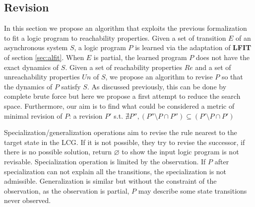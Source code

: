 \subsection{Revision}
\label{sec:algorithm}

    In this section we propose an algorithm that exploits the previous formalization to fit a logic program to reachability properties.
    Given a set of transition $E$ of an asynchronous system $S$, a logic program $P$ is learned via the adaptation of \textbf{LFIT} of section \ref{sec:alfit}.
    When $E$ is partial, the learned program $P$ does not have the exact dynamics of $S$.
    Given a set of reachability properties $Re$ and a set of unreachability properties $Un$ of $S$, we propose an algorithm to revise $P$ so that the dynamics of $P$ satisfy $S$.
    As discussed previously, this can be done by complete brute force but here we propose a first attempt to reduce the search space.
    Furthermore, our aim is to find what could be considered a metric of minimal revision of $P$:
    a revision $P'$ s.t. $\nexists P'', (P''\setminus P \cap P'')\subseteq (P' \setminus P \cap P')$
   
    Specialization/generalization operations aim to revise the rule nearest to the target state in the LCG. If it is not possible, they try to revise the successor, if there is no possible solution, return $\varnothing$ to show the input logic program is not revisable. Specialization operation is limited by the observation. If $P$ after specialization can not explain all the transitions, the specialization is not admissible. %
    Generalization is similar but without the constraint of the observation, as the observation is partial, $P$ may describe some state transitions never observed.
   
